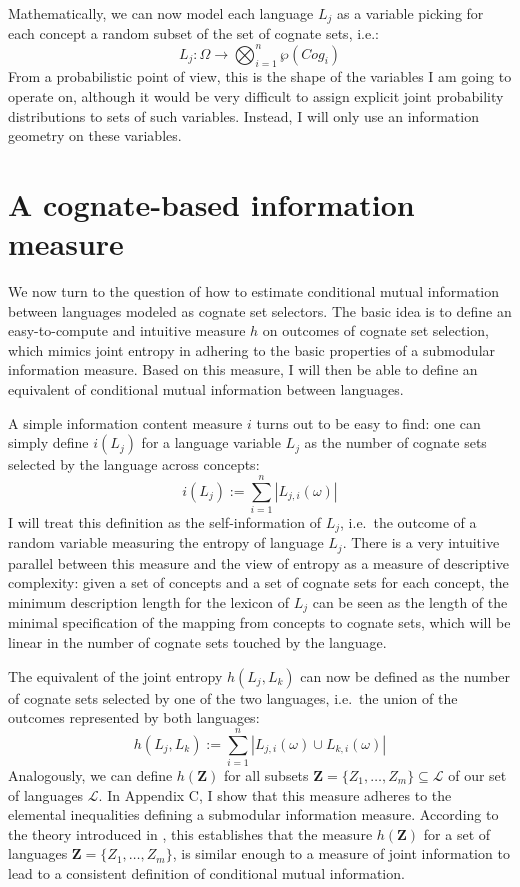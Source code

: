 Mathematically, we can now model each language $L_j$ as a variable picking for each concept a random subset of the set of cognate sets, i.e.:
\begin{equation*}
  L_j: \Omega \rightarrow \bigotimes_{i = 1}^{n} \wp(Cog_i)
\end{equation*}
From a probabilistic point of view, this is the shape of the variables I am going to operate on, although it would be very difficult to assign explicit joint probability distributions to sets of such variables. Instead, I will only use an information geometry on these variables.

\section{A cognate-based information measure}\label{sec:6.2}
We now turn to the question of how to estimate conditional mutual information between languages modeled as cognate set selectors. The basic idea is to define an easy-to-compute and intuitive measure $h$ on outcomes of cognate set selection, which mimics joint entropy in adhering to the basic properties of a submodular information measure. Based on this measure, I will then be able to define an equivalent of conditional mutual information between languages.

A simple information content measure $i$ turns out to be easy to find: one can simply define $i(L_j)$ for a language variable $L_j$ as the number of cognate sets selected by the language across concepts:
\begin{equation*}
 i(L_j) := \sum_{i = 1}^n | L_{j,i}(\omega)|
\end{equation*}
I will treat this definition as the self-information of $L_j$, i.e.\ the outcome of a random variable measuring the entropy of language $L_j$. There is a very intuitive parallel between this measure and the view of entropy as a measure of descriptive complexity: given a set of concepts and a set of cognate sets for each concept, the minimum description length for the lexicon of $L_j$ can be seen as the length of the minimal specification of the mapping from concepts to cognate sets, which will be linear in the number of cognate sets touched by the language.

The equivalent of the joint entropy $h(L_j,L_k)$ can now be defined as the number of cognate sets selected by one of the two languages, i.e.\ the union of the outcomes represented by both languages: 
\begin{equation*}
 h(L_j,L_k) := \sum_{i = 1}^n | L_{j,i}(\omega) \cup L_{k,i}(\omega)|
\end{equation*}
Analogously, we can define $h(\mathbf{Z})$ for all subsets $\mathbf{Z} = \{Z_1,\dots,Z_m\} \subseteq \mathcal{L}$ of our set of languages $\mathcal{L}$. In Appendix C, I show that this measure adheres to the elemental inequalities defining a submodular information measure. According to the theory introduced in , this establishes that the measure $h(\mathbf{Z})$ for a set of languages $\mathbf{Z} = \{Z_1,\dots,Z_m\}$, is similar enough to a measure of joint information to lead to a consistent definition of conditional mutual information.

